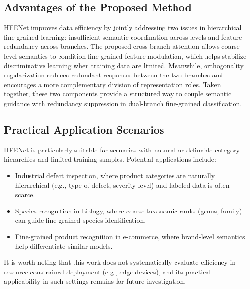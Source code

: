 \documentclass[pdflatex,iicol,sn-mathphys-num]{sn-jnl}
\theoremstyle{thmstyleone}%
\theoremstyle{thmstyletwo}%
\theoremstyle{thmstylethree}%
\begin{document}
\subsection{Advantages of the Proposed Method}
HFENet improves data efficiency by jointly addressing two issues in hierarchical fine-grained learning: insufficient semantic coordination across levels and feature redundancy across branches. The proposed cross-branch attention allows coarse-level semantics to condition fine-grained feature modulation, which helps stabilize discriminative learning when training data are limited. Meanwhile, orthogonality regularization reduces redundant responses between the two branches and encourages a more complementary division of representation roles. Taken together, these two components provide a structured way to couple semantic guidance with redundancy suppression in dual-branch fine-grained classification.

\subsection{Practical Application Scenarios}
HFENet is particularly suitable for scenarios with natural or definable category hierarchies and limited training samples. Potential applications include:
\begin{itemize}
    \item Industrial defect inspection, where product categories are naturally hierarchical (e.g., type of defect, severity level) and labeled data is often scarce.
    \item Species recognition in biology, where coarse taxonomic ranks (genus, family) can guide fine-grained species identification.
    \item Fine-grained product recognition in e-commerce, where brand-level semantics help differentiate similar models.
\end{itemize}
It is worth noting that this work does not systematically evaluate efficiency in resource-constrained deployment (e.g., edge devices), and its practical applicability in such settings remains for future investigation.
\end{document}
